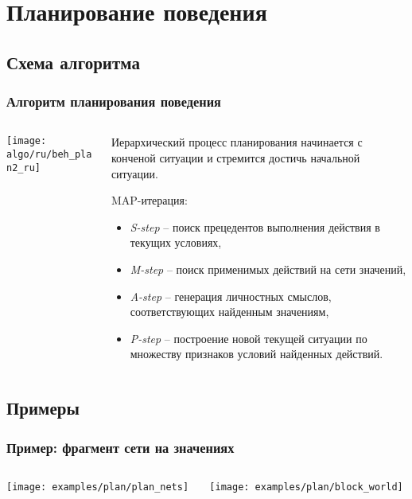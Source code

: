 \documentclass[default]{beamer}
\begin{document}
	\section{Планирование поведения}
	\subsection{Схема алгоритма}
	\begin{frame}
		\frametitle{Алгоритм планирования поведения}
		
		\begin{columns}
			\begin{column}{0.6\textwidth}
				\texttt{[image: algo/ru/beh\_plan2\_ru]}
				\vspace{10pt}
				\nocite{*}
				\printbibliography[keyword={plan}, resetnumbers=true]
				\printbibliography[keyword={causnet}]
			\end{column}
			\begin{column}{0.4\textwidth}
				\scriptsize
				Иерархический процесс планирования начинается с конченой ситуации и стремится достичь начальной ситуации.
				\par\bigskip
				MAP-итерация:
				\begin{itemize}
					\item \textit{S-step} -- поиск прецедентов выполнения действия в текущих условиях,
					\item \textit{M-step} -- поиск применимых действий на сети значений,
					\item \textit{A-step} -- генерация личностных смыслов, соответствующих найденным значениям,
					\item \textit{P-step} -- построение новой текущей ситуации по множеству признаков условий найденных действий.
					
				\end{itemize}
			\end{column}
		\end{columns}
		
	\end{frame}		
	
	\subsection{Примеры}
	\begin{frame}
		\frametitle{Пример: фрагмент сети на значениях}
		\begin{columns}
			\begin{column}{0.7\textwidth}
				\centering
				\texttt{[image: examples/plan/plan\_nets]}
			\end{column}
			\begin{column}{0.3\textwidth}
				\centering
				\texttt{[image: examples/plan/block\_world]}
			\end{column}
		\end{columns}
	\end{frame}	
	
\end{document}
